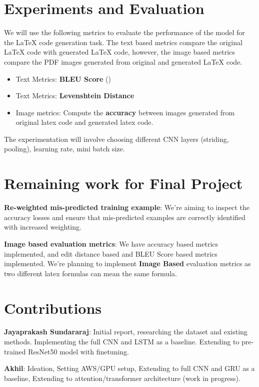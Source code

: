 \documentclass{article}
\begin{document}
\section{Experiments and Evaluation}

We will use the following metrics to evaluate the performance of the model for the LaTeX code generation task. The text based metrics compare the original LaTeX code with generated LaTeX code, however, the image based metrics compare the PDF images generated from original and generated LaTeX code.

\begin{itemize}
    \item Text Metrics: \textbf{BLEU Score} (\cite{papineni-etal-2002-bleu})
    \item Text Metrics: \textbf{Levenshtein Distance}
    \item Image metrics: Compute the \textbf{accuracy} between images generated from original latex code and generated latex code. 
\end{itemize}

The experimentation will involve choosing different CNN layers (striding, pooling), learning rate, mini batch size. 

\section{Remaining work for Final Project}

\textbf{Re-weighted mis-predicted training example}: We're aiming to inspect the accuracy losses and ensure that mis-predicted examples are correctly identified with increased weighting. 

\textbf{Image based evaluation metrics}: We have accuracy based metrics implemented, and edit distance based and BLEU Score based metrics implemented. We're planning to implement \textbf{Image Based} evaluation metrics as two different latex formulas can mean the same formula.

\section{Contributions}

\textbf{Jayaprakash Sundararaj}: Initial report, researching the dataset and existing methods. Implementing the full CNN and LSTM as a baseline. Extending to pre-trained ResNet50 model with finetuning.

\textbf{Akhil}: Ideation, Setting AWS/GPU setup, Extending to full CNN and GRU as a baseline, Extending to attention/transformer architecture (work in progress).
\end{document}
